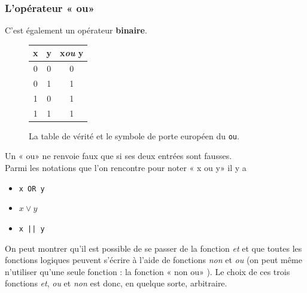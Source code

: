 \subsubsection*{L'opérateur « ou» }

C'est également un opérateur \textbf{binaire}.

\begin{figure}[H]
    \begin{center}
        \begin{tabular}{|c|c|c|}
            \hline\rowcolor{UGLiOrange}
            {\boxfont\color{white}x} & {\boxfont\color{white}y} & {\boxfont\color{white}x\textit{ou} y} \\

            \hline
            0                        & 0                        & 0                                     \\
            \hline
            0                        & 1                        & 1                                     \\
            \hline
            1                        & 0                        & 1                                     \\
            \hline
            1                        & 1                        & 1                                     \\
            \hline
        \end{tabular}\hspace{3em}
    \end{center}
    \caption*{La table de vérité et le symbole de porte européen du \texttt{ou}.}
\end{figure}

Un « ou»  ne renvoie faux que si ses deux entrées sont fausses.\\
Parmi les notations que l'on rencontre pour noter « x ou y»  il y a
\begin{itemize}
    \item 	 \texttt{x OR y}
    \item 	$x\vee y$
    \item 	\texttt{x || y}
\end{itemize}

On peut montrer qu'il est possible de se passer de la fonction \textit{et} et que toutes les fonctions logiques peuvent s'écrire à l'aide de
fonctions \textit{non} et \textit{ou} (on peut même n'utiliser qu'une seule fonction : la fonction « non ou» ). Le choix de ces trois fonctions
\textit{et}, \textit{ou} et \textit{non} est donc, en quelque sorte, arbitraire.

